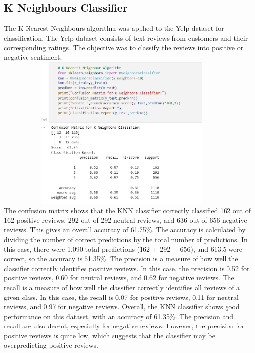 \documentclass[a4paper, 12pt]{report}
\begin{document}
\subsection{K Neighbours Classifier}
The K-Nearest Neighbours algorithm was applied to the Yelp dataset for classification. The Yelp dataset consists of text reviews from customers and their corresponding ratings. The objective was to classify the reviews into positive or negative sentiment.\\
\includegraphics[height=3in,width=5in]{16}\\
The confusion matrix shows that the KNN classifier correctly classified 162 out of 162 positive reviews, 292 out of 292 neutral reviews, and 636 out of 656 negative reviews. This gives an overall accuracy of 61.35\%.
The accuracy is calculated by dividing the number of correct predictions by the total number of predictions. In this case, there were 1,090 total predictions (162 + 292 + 656), and 613.5 were correct, so the accuracy is 61.35\%.
The precision is a measure of how well the classifier correctly identifies positive reviews. In this case, the precision is 0.52 for positive reviews, 0.60 for neutral reviews, and 0.62 for negative reviews.
The recall is a measure of how well the classifier correctly identifies all reviews of a given class. In this case, the recall is 0.07 for positive reviews, 0.11 for neutral reviews, and 0.97 for negative reviews.
Overall, the KNN classifier shows good performance on this dataset, with an accuracy of 61.35\%. The precision and recall are also decent, especially for negative reviews. However, the precision for positive reviews is quite low, which suggests that the classifier may be overpredicting positive reviews.
\pagebreak
\end{document}
